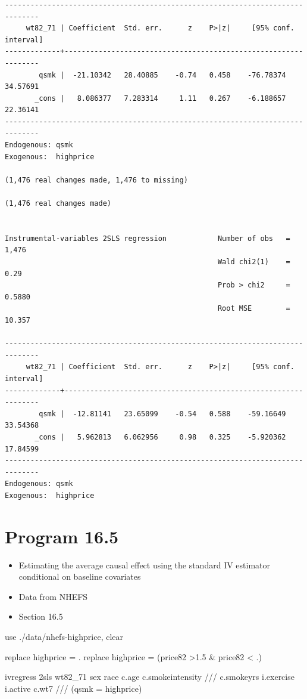\documentclass[
  10pt,
  a4paper,
]{book}
\newenvironment{Shaded}{\begin{snugshade}}{\end{snugshade}}
\newcommand{\CommentTok}[1]{\textcolor[rgb]{0.37,0.37,0.37}{#1}}
\newcommand{\KeywordTok}[1]{\textcolor[rgb]{0.00,0.46,0.62}{#1}}
\newcommand{\NormalTok}[1]{\textcolor[rgb]{0.00,0.46,0.62}{#1}}
\providecommand{\tightlist}{%
  \setlength{\itemsep}{0pt}\setlength{\parskip}{0pt}}
\begin{document}
\begin{verbatim}
------------------------------------------------------------------------------
     wt82_71 | Coefficient  Std. err.      z    P>|z|     [95% conf. interval]
-------------+----------------------------------------------------------------
        qsmk |  -21.10342   28.40885    -0.74   0.458    -76.78374    34.57691
       _cons |   8.086377   7.283314     1.11   0.267    -6.188657    22.36141
------------------------------------------------------------------------------
Endogenous: qsmk
Exogenous:  highprice

(1,476 real changes made, 1,476 to missing)

(1,476 real changes made)


Instrumental-variables 2SLS regression            Number of obs   =      1,476
                                                  Wald chi2(1)    =       0.29
                                                  Prob > chi2     =     0.5880
                                                  Root MSE        =     10.357

------------------------------------------------------------------------------
     wt82_71 | Coefficient  Std. err.      z    P>|z|     [95% conf. interval]
-------------+----------------------------------------------------------------
        qsmk |  -12.81141   23.65099    -0.54   0.588    -59.16649    33.54368
       _cons |   5.962813   6.062956     0.98   0.325    -5.920362    17.84599
------------------------------------------------------------------------------
Endogenous: qsmk
Exogenous:  highprice
\end{verbatim}

\section{Program 16.5}\label{program-16.5-1}

\begin{itemize}
\tightlist
\item
  Estimating the average causal effect using the standard IV estimator conditional on baseline covariates
\item
  Data from NHEFS
\item
  Section 16.5
\end{itemize}

\begin{Shaded}
\begin{Highlighting}[]
\KeywordTok{use}\NormalTok{ ./}\KeywordTok{data}\NormalTok{/nhefs{-}highprice, }\KeywordTok{clear}

\KeywordTok{replace}\NormalTok{ highprice = .}
\KeywordTok{replace}\NormalTok{ highprice = (price82 \textgreater{}1.5 \& price82 \textless{} .)}

\NormalTok{ivregress 2sls wt82\_71 sex race c.age c.smokeintensity }\CommentTok{///}
\NormalTok{  c.smokeyrs i.exercise i.active c.wt7 }\CommentTok{///}
\NormalTok{  (qsmk = highprice)}
\end{Highlighting}
\end{Shaded}
\end{document}
